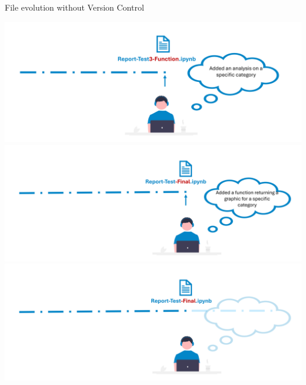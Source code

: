 \documentclass[xcolor=x11names,compress]{beamer}
\renewcommand{\(}{\begin{columns}}
\renewcommand{\)}{\end{columns}}
\newcommand{\<}[1]{\begin{column}{#1}}
\renewcommand{\>}{\end{column}}
\begin{document}
\begin{frame}{File evolution  \textcolor{brique}{without Version Control}  }
\begin{center}
\begin{itemize}
    {\includegraphics[width = 1.0\textwidth]{FileChange5a.png} \\ }
    {\includegraphics[width = 1.0\textwidth]{FileChange6a.png} \\ }
    {\includegraphics[width = 1.0\textwidth]{FileChange7a.png} \\ }
\end{itemize}
\end{center}
\end{frame}
\end{document}
